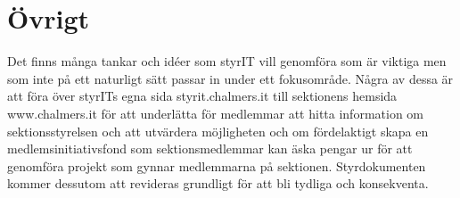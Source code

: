 \documentclass[11pt, includeaddress]{../../classes/cthit}
\begin{document}
\section{Övrigt}
Det finns många tankar och idéer som styrIT vill genomföra som är viktiga men som inte på ett naturligt sätt passar in under ett fokusområde. Några av dessa är att föra över styrITs egna sida styrit.chalmers.it till sektionens hemsida www.chalmers.it för att underlätta för medlemmar att hitta information om sektionsstyrelsen och att utvärdera möjligheten och om fördelaktigt skapa en medlemsinitiativsfond som sektionsmedlemmar kan äska pengar ur för att genomföra projekt som gynnar medlemmarna på sektionen. Styrdokumenten kommer dessutom att revideras grundligt för att bli tydliga och konsekventa.
\end{document}
